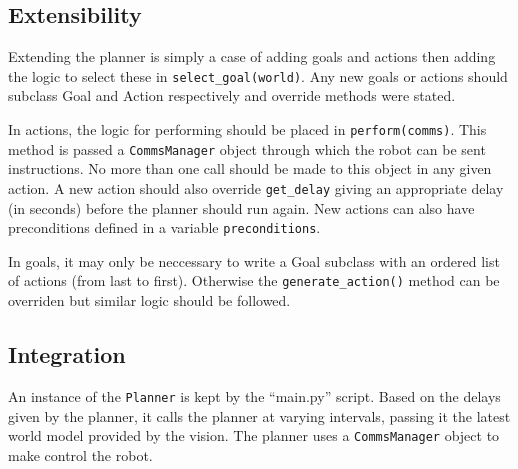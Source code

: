 \subsection{Extensibility}

Extending the planner is simply a case of adding goals and actions then adding the logic to select these in \texttt{select\_goal(world)}. Any new goals or actions should subclass Goal and Action respectively and override methods were stated.

In actions, the logic for performing should be placed in \texttt{perform(comms)}. This method is passed a \texttt{CommsManager} object through which the robot can be sent instructions. No more than one call should be made to this object in any given action. A new action should also override \texttt{get\_delay} giving an appropriate delay (in seconds) before the planner should run again. New actions can also have preconditions defined in a variable \texttt{preconditions}.

In goals, it may only be neccessary to write a Goal subclass with an ordered list of actions (from last to first). Otherwise the \texttt{generate\_action()} method can be overriden but similar logic should be followed.

\subsection{Integration}

An instance of the \texttt{Planner} is kept by the ``main.py'' script. Based on the delays given by the planner, it calls the planner at varying intervals, passing it the latest world model provided by the vision. The planner uses a \texttt{CommsManager} object to make control the robot.


